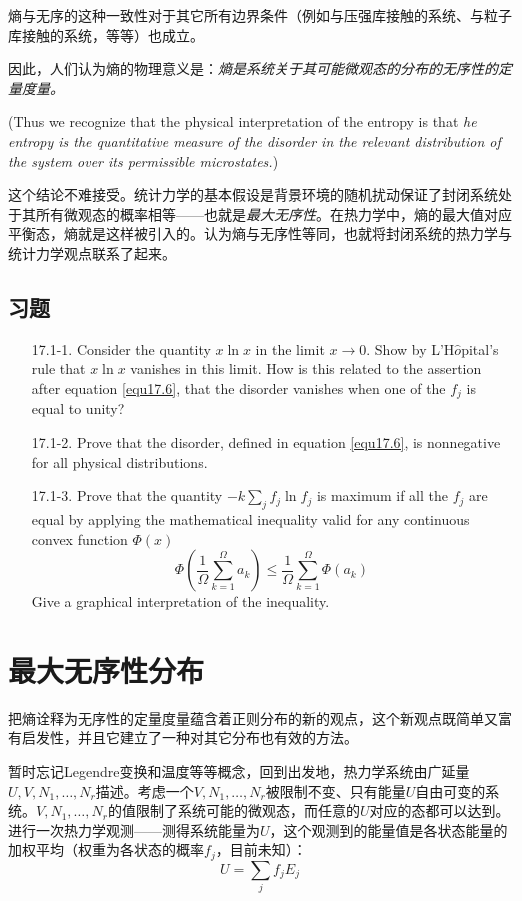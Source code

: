 熵与无序的这种一致性对于其它所有边界条件（例如与压强库接触的系统、与粒子库接触的系统，等等）也成立。

因此，人们认为熵的物理意义是：\textit{熵是系统关于其可能微观态的分布的无序性的定量度量。}

(Thus we recognize that the physical interpretation of the entropy is that {\it he entropy is the quantitative measure of the disorder in the relevant distribution of the system over its permissible microstates.})

这个结论不难接受。统计力学的基本假设是背景环境的随机扰动保证了封闭系统处于其所有微观态的概率相等——也就是{\it 最大无序性}。在热力学中，熵的最大值对应平衡态，熵就是这样被引入的。认为熵与无序性等同，也就将封闭系统的热力学与统计力学观点联系了起来。

\subsection*{习题}
\begin{itemize}
\item[17.1-1.]  Consider the quantity $x \ln x$ in the limit $x \to 0$. Show by L'H$\hat{o}$pital's rule that $x \ln x$ vanishes in this limit. How is this related to the assertion after equation \eqref{equ17.6}, that the disorder vanishes when one of the $f_j$ is equal to unity?
\item[17.1-2.] Prove that the disorder, defined in equation \eqref{equ17.6}, is nonnegative for all physical distributions.
\item[17.1-3.] Prove that the quantity $-k \sum_j f_j \ln f_j$ is maximum if all the $f_j$ are equal by applying the mathematical inequality valid for any continuous convex function $\Phi(x)$
\[
	\Phi \left( \frac{1}{\Omega} \sum_{k = 1}^\Omega a_k \right) \le \frac{1}{\Omega} \sum_{k = 1}^\Omega \Phi (a_k)
\]
Give a graphical interpretation of the inequality.
\end{itemize}

\section{最大无序性分布}
\label{sec17.2}
把熵诠释为无序性的定量度量蕴含着正则分布的新的观点，这个新观点既简单又富有启发性，并且它建立了一种对其它分布也有效的方法。

暂时忘记Legendre变换和温度等等概念，回到出发地，热力学系统由广延量$U, V, N_1, \dots, N_r$描述。考虑一个$V, N_1, \dots, N_r$被限制不变、只有能量$U$自由可变的系统。$V, N_1, \dots, N_r$的值限制了系统可能的微观态，而任意的$U$对应的态都可以达到。进行一次热力学观测——测得系统能量为$U$，这个观测到的能量值是各状态能量的加权平均（权重为各状态的概率$f_j$，目前未知）：
\begin{equation}
	U = \sum_j f_j E_j
\label{equ17.8}
\end{equation}

